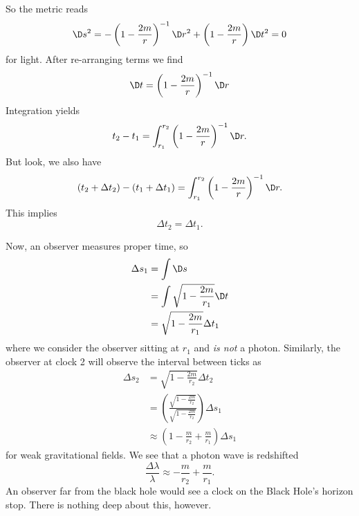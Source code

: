 \noindent\ignorespaces%
So the metric reads
\begin{equation}
\D s^{2}=-\left(1-\frac{2m}{r}\right)^{-1}\D r^{2}
+\left(1-\frac{2m}{r}\right)\D t^{2}=0
\end{equation}
for light. After re-arranging terms we find
\begin{equation}
\D t=\left(1-\frac{2m}{r}\right)^{-1}\D r
\end{equation}
Integration yields
\begin{equation}
t_{2}-t_{1}=\int^{r_{2}}_{r_{1}}\left(1-\frac{2m}{r}\right)^{-1}\D r.
\end{equation}
But look, we also have
\begin{equation}
(t_{2}+\Delta t_{2})-(t_{1}+\Delta t_{1})=\int^{r_{2}}_{r_{1}}\left(1-\frac{2m}{r}\right)^{-1}\D r.
\end{equation}
This implies
\begin{equation}
\Delta t_{2}=\Delta t_{1}.
\end{equation}

Now, an observer measures proper time, so
\begin{subequations}
\begin{align}
\Delta s_{1}
&=\int\D s\\
&=\int\sqrt{1-\frac{2m}{r_{1}}}\D t\\
&=\sqrt{1-\frac{2m}{r_{1}}}\Delta t_{1}
\end{align}
\end{subequations}
where we consider the observer sitting at $r_{1}$ and \emph{is not}
a photon.
Similarly, the observer at clock 2 will observe the interval
between ticks as
\begin{subequations}
\begin{align}
\Delta s_{2}
&=\sqrt{1-\frac{2m}{r_{2}}}\Delta t_{2}\\
&=\left(\frac{\sqrt{1-\frac{2m}{r_{2}}}}{\sqrt{1-\frac{2m}{r_{2}}}}\right)\Delta s_{1}\\
&\approx\left(1-\frac{m}{r_{2}}+\frac{m}{r_{1}}\right)\Delta s_{1}
\end{align}
\end{subequations}
for weak gravitational fields. We see that a photon wave is
redshifted
\begin{equation}
\frac{\Delta\lambda}{\lambda}\approx
-\frac{m}{r_{2}}+\frac{m}{r_{1}}.
\end{equation}
An observer far from the black hole would see a clock on the
Black Hole's horizon stop. There is nothing deep about this, however.



